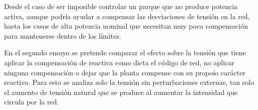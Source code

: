 \documentclass{book}
\begin{document}
\begin{enumerate}[1.]
Desde el caso de ser imposible controlar un parque que no produce potencia activa, aunque podr\'ia ayudar a compensar las desviaciones de tensi\'on en la red, hasta los casos de alta potencia nominal que necesitan muy poca compensaci\'on para mantenerse dentro de los l\'imites. \par

\end{enumerate}

En el segundo ensayo se pretende comparar el efecto sobre la tensi\'on que tiene aplicar la compensaci\'on de reactiva como dicta el c\'odigo de red, no aplicar ninguna compensaci\'on o dejar que la planta compense con su propoio car\'acter reactivo. Para esto se analiza solo la tensi\'on sin perturbaciones externas, tan solo el aumento de tensi\'on natural que se produce al aumentar la intensidad que circula por la red. \par
\end{document}
